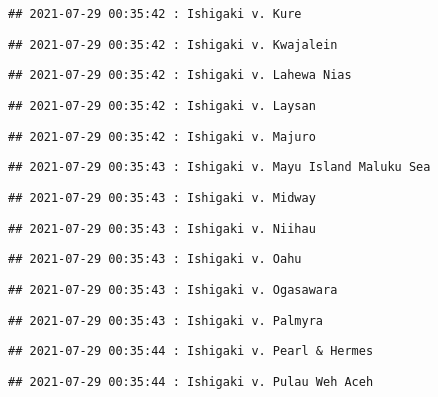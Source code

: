 \documentclass[
]{article}
\begin{document}
\begin{verbatim}
## 2021-07-29 00:35:42 : Ishigaki v. Kure
\end{verbatim}

\begin{verbatim}
## 2021-07-29 00:35:42 : Ishigaki v. Kwajalein
\end{verbatim}

\begin{verbatim}
## 2021-07-29 00:35:42 : Ishigaki v. Lahewa Nias
\end{verbatim}

\begin{verbatim}
## 2021-07-29 00:35:42 : Ishigaki v. Laysan
\end{verbatim}

\begin{verbatim}
## 2021-07-29 00:35:42 : Ishigaki v. Majuro
\end{verbatim}

\begin{verbatim}
## 2021-07-29 00:35:43 : Ishigaki v. Mayu Island Maluku Sea
\end{verbatim}

\begin{verbatim}
## 2021-07-29 00:35:43 : Ishigaki v. Midway
\end{verbatim}

\begin{verbatim}
## 2021-07-29 00:35:43 : Ishigaki v. Niihau
\end{verbatim}

\begin{verbatim}
## 2021-07-29 00:35:43 : Ishigaki v. Oahu
\end{verbatim}

\begin{verbatim}
## 2021-07-29 00:35:43 : Ishigaki v. Ogasawara
\end{verbatim}

\begin{verbatim}
## 2021-07-29 00:35:43 : Ishigaki v. Palmyra
\end{verbatim}

\begin{verbatim}
## 2021-07-29 00:35:44 : Ishigaki v. Pearl & Hermes
\end{verbatim}

\begin{verbatim}
## 2021-07-29 00:35:44 : Ishigaki v. Pulau Weh Aceh
\end{verbatim}
\end{document}

